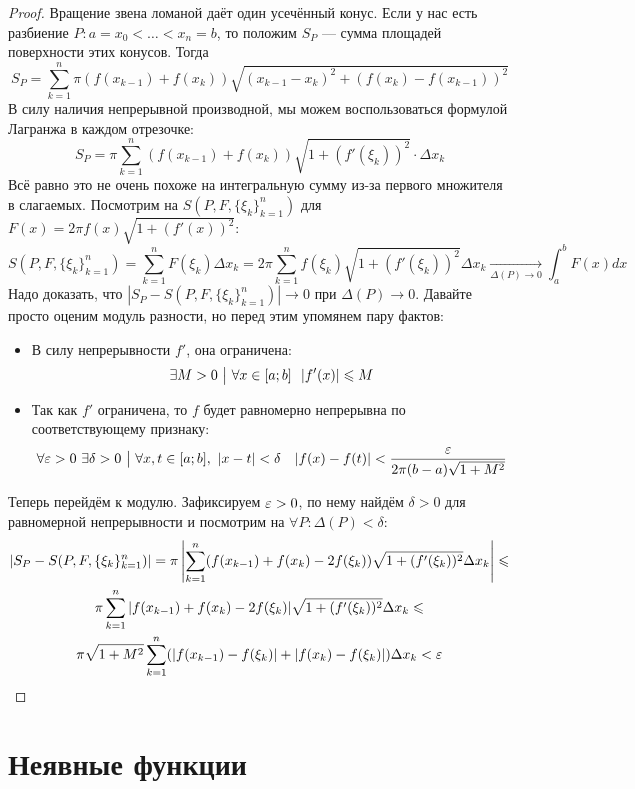 \begin{proof}
	Вращение звена ломаной даёт один усечённый конус. Если у нас есть разбиение $P \colon a = x_0 < \ldots < x_n = b$, то положим $S_P$ --- сумма площадей поверхности этих конусов. Тогда
	\[
		S_P = \sum_{k = 1}^n \pi (f(x_{k - 1}) + f(x_k)) \sqrt{(x_{k - 1} - x_k)^2 + (f(x_k) - f(x_{k - 1}))^2}
	\]
	В силу наличия непрерывной производной, мы можем воспользоваться формулой Лагранжа в каждом отрезочке:
	\[
		S_P = \pi \sum_{k = 1}^n (f(x_{k - 1}) + f(x_k)) \sqrt{1 + (f'(\xi_k))^2} \cdot \Delta x_k
	\]
	Всё равно это не очень похоже на интегральную сумму из-за первого множителя в слагаемых. Посмотрим на $S(P, F, \{\xi_k\}_{k = 1}^n)$ для $F(x) = 2\pi f(x) \sqrt{1 + (f'(x))^2}$:
	\[
		S(P, F, \{\xi_k\}_{k = 1}^n) = \sum_{k = 1}^n F(\xi_k) \Delta x_k = 2\pi \sum_{k = 1}^n f(\xi_k) \sqrt{1 + (f'(\xi_k))^2} \Delta x_k \xrightarrow[\Delta(P) \to 0]{} \int_a^b F(x)dx
	\]
	Надо доказать, что $|S_P - S(P, F, \{\xi_k\}_{k = 1}^n)| \to 0$ при $\Delta(P) \to 0$. Давайте просто оценим модуль разности, но перед этим упомянем пару фактов:
	\begin{itemize}
		\item В силу непрерывности $f'$, она ограничена:
		\[
			\exists M > 0 \ \big|\  \forall x \in [a; b]\ \ |f'(x)| \leqslant M
		\]
		
		\item Так как $f'$ ограничена, то $f$ будет равномерно непрерывна по соответствующему признаку:
		\[
			\forall \varepsilon > 0\ \exists \delta > 0 \ \big|\  \forall x, t \in [a; b],\ |x - t| < \delta \quad |f(x) - f(t)| < \frac{\varepsilon}{2\pi (b - a) \sqrt{1 + M^2}}
		\]
	\end{itemize}
	Теперь перейдём к модулю. Зафиксируем $\varepsilon > 0$, по нему найдём $\delta > 0$ для равномерной непрерывности и посмотрим на $\forall P \colon \Delta(P) < \delta$:
	\begin{multline*}
		|S_P - S(P, F, \{\xi_k\}_{k = 1}^n)| = \pi \left|\sum_{k = 1}^n (f(x_{k - 1}) + f(x_k) - 2f(\xi_k))\sqrt{1 + (f'(\xi_k))^2} \Delta x_k\right| \leqslant
		\\
		\pi \sum_{k = 1}^n |f(x_{k - 1}) + f(x_k) - 2f(\xi_k)| \sqrt{1 + (f'(\xi_k))^2} \Delta x_k \leqslant
		\\
		\pi \sqrt{1 + M^2}\sum_{k = 1}^n (|f(x_{k - 1}) - f(\xi_k)| + |f(x_k) - f(\xi_k)|) \Delta x_k < \varepsilon
	\end{multline*}
\end{proof}

\section{Неявные функции}


